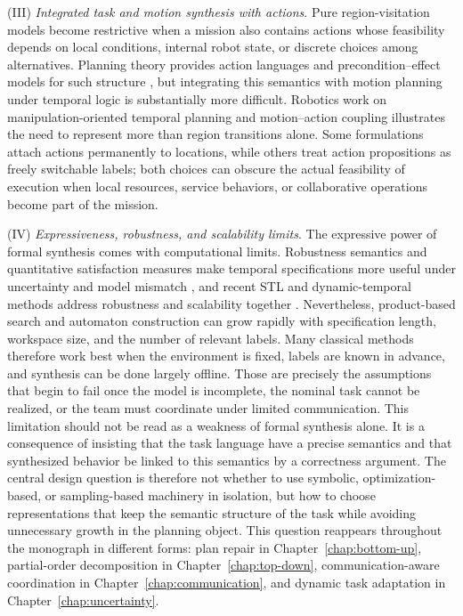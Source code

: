  (III) \emph{Integrated task and motion synthesis with actions}. Pure
region-visitation models become restrictive when a mission also contains actions whose
feasibility depends on local conditions, internal robot state, or discrete choices among
alternatives. Planning theory provides action languages and precondition--effect models
for such structure \citep{pednault1989adl, gelfond1998action}, but integrating this
semantics with motion planning under temporal logic is substantially more difficult.
Robotics work on manipulation-oriented temporal planning and motion--action coupling
\citep{he2015towards, guo2013motion} illustrates the need to represent more than region
transitions alone. Some formulations attach actions permanently to locations, while others
treat action propositions as freely switchable labels; both choices can obscure the actual
feasibility of execution when local resources, service behaviors, or collaborative
operations become part of the mission.

 (IV) \emph{Expressiveness, robustness, and scalability limits}. The expressive
power of formal synthesis comes with computational limits. Robustness semantics and
quantitative satisfaction measures make temporal specifications more useful under
uncertainty and model mismatch \citep{fainekos2009robustness, abbas2013probabilistic}, and
recent STL and dynamic-temporal methods address robustness and scalability together
\citep{yang2024stlmpc, buyukkocak2024sequential}. Nevertheless, product-based search and
automaton construction can grow rapidly with specification length, workspace size, and the
number of relevant labels. Many classical methods therefore work best when the environment
is fixed, labels are known in advance, and synthesis can be done largely offline. Those
are precisely the assumptions that begin to fail once the model is incomplete, the nominal
task cannot be realized, or the team must coordinate under limited communication.
This limitation should not be read as a weakness of formal synthesis alone. It is a
consequence of insisting that the task language have a precise semantics and that
synthesized behavior be linked to this semantics by a correctness argument. The central
design question is therefore not whether to use symbolic, optimization-based, or
sampling-based machinery in isolation, but how to choose representations that keep the
semantic structure of the task while avoiding unnecessary growth in the planning object.
This question reappears throughout the monograph in different forms: plan repair in
Chapter~\ref{chap:bottom-up}, partial-order decomposition in Chapter~\ref{chap:top-down},
communication-aware coordination in Chapter~\ref{chap:communication}, and dynamic task
adaptation in Chapter~\ref{chap:uncertainty}.


